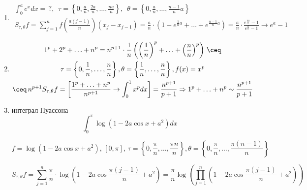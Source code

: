 \begin{example}
    \begin{enumerate}
    \item 
    \[
        \begin{gathered}
            \int_0^{a} e^x dx = \,? , \,\,\, \tau = \left\{ 0, \frac{a}{n}, \frac{2a}{n}, \ldots, \frac{na}{n} \right\}, \,\,\, \theta = \left\{ 0, \frac{a}{n}, \ldots , \frac{n - 1}{n} a \right\}\\
            S_{\tau, \theta} f = \sum_{j = 1}^n f \left( \frac{a(j - 1)}{n} \right)(x_j - x_{j - 1}) 
            = \frac{a}{n} \cdot \left( 1 + e ^ {\frac{1}{n}a} + \ldots + e ^{\frac{n - 1}{n} a} \right) 
            = \frac{a}{n} \cdot \frac{e ^ {\frac{na}{n}} - 1}{e ^ {\frac{a}{n}} - 1} \to e^a - 1
        \end{gathered}
    \]
    \item
    \[
        \begin{gathered}
            1 ^ p + 2 ^ p + \ldots + n ^ p = n ^ {p + 1} \cdot \frac{1}{n} \left( \left( \frac{1}{n} \right) ^ p + \ldots + \left( \frac{n}{n} \right) ^ p \right) \, \ceq\\
            \tau = \left\{ 0, \frac{1}{n}, \ldots , \frac{n}{n} \right\}, \theta = \left\{\frac{1}{n}, \ldots , \frac{n}{n}  \right\}, f(x) = x ^ p\\
            \ceq \, n ^ {p + 1} S_{\tau, \theta} f = \left[\frac{1 ^ p + \ldots + n ^ p}{n ^ {p + 1}} \to \int_0^1 x ^ p dx\right]
            = \frac{n^{p + 1}}{p + 1} \Rightarrow 1 ^ p + \ldots + n ^ p \sim \frac{n ^ {p + 1}}{p + 1}
        \end{gathered}
    \]

    \item интеграл Пуассона
    \[
        \int_0^\pi \log{(1 - 2a \cos{x} + a ^ 2)} dx
    \]

    \[
        f = \log{(1 - 2a \cos{x} + a ^ 2)},\, [0, \pi],\, \tau = \left\{0, \frac{\pi}{n}, \ldots , \frac{\pi n}{n} \right\}, \theta = \left\{0, \frac{\pi}{n}, \ldots , \frac{\pi (n - 1)}{n} \right\}
    \]

    \[
        S_{\tau, \theta} f = \sum_{j = 1}^n \frac{\pi}{n} \cdot \log\left(1 - 2a \cos{\frac{\pi (j - 1)}{n} + a ^ 2}\right) = \frac{\pi}{n} \log\left(\prod_{j = 1}^n \left(1 - 2a \cos{\frac{\pi (j - 1)}{n} + a ^ 2}\right)\right)
    \]


\end{enumerate}
\end{example}
